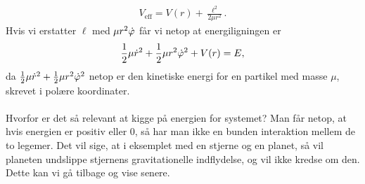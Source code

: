 \begin{align}
	V_\text{eff} = V(r) + \frac{\ell  ^2}{2\mu r^2}.
\end{align}
Hvis vi erstatter $\ell $ med $\mu r^2 \dot{\varphi}$ får vi netop at energiligningen er
\begin{align}
	\frac{1}{2}\mu \dot{r}^2 + \frac{1}{2} \mu r^2 \dot{\varphi}^2 + V(r) = E,
\end{align}
da $\frac{1}{2}\mu \dot{r}^2 + \frac{1}{2} \mu r^2 \dot{\varphi}^2$ netop er den kinetiske energi for en partikel med masse $\mu$, skrevet i polære koordinater. \\ \\
%
%
Hvorfor er det så relevant at kigge på energien for systemet? Man får netop, at hvis energien er positiv eller 0, så har man ikke en bunden interaktion mellem de to legemer. Det vil sige, at i eksemplet med en stjerne og en planet, så vil planeten undslippe stjernens gravitationelle indflydelse, og vil ikke kredse om den. Dette kan vi gå tilbage og vise senere.


